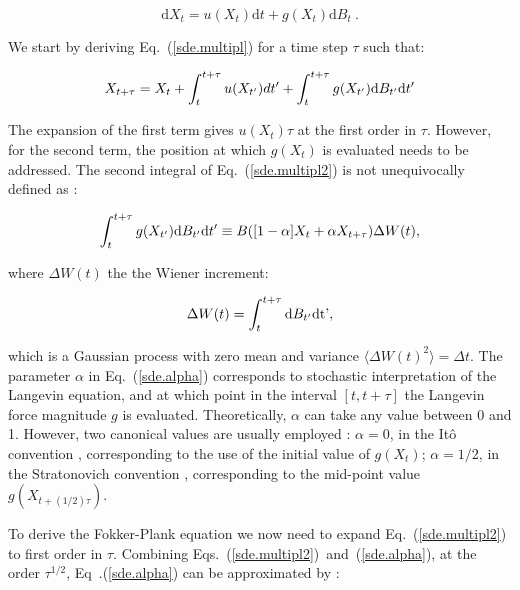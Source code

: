 \begin{equation}
	\mathrm{d}X_t = u(X_t)\mathrm{d}t + g(X_t)\mathrm{d}B_t~.
	\label{sde.multipl}
\end{equation}

We start by deriving Eq.~(\ref{sde.multipl}) for a time step $\tau$ such that:

\begin{equation}
	X_{t+\tau} = X_t + \int_{t}^{t+\tau} u(X_{t'})dt' + \int_{t}^{t+\tau} g(X_{t'})\textnormal{d}B_{t'}\textnormal{d}t'
	\label{sde.multipl2}
\end{equation}

The expansion of the first term gives $u(X_t)\tau$ at the first order in $\tau$. However, for the second term, the position at which $g(X_t)$ is evaluated needs to be addressed. The second integral of Eq.~{(\ref{sde.multipl2})} is not unequivocally defined as \cite{sancho_brownian_2011}:

\begin{equation}
	\int_{t}^{t+\tau}g(X_{t'})\textnormal{d}B_{t'}\textnormal{d}t' \equiv B([1 - \alpha] X_t + \alpha X_{t+\tau}) \Delta W(t),
	\label{sde.alpha}
\end{equation}

where $\Delta W (t)$ the the Wiener increment:

\begin{equation}
	\Delta W(t) = \int_{t}^{t+\tau} \textnormal{d} B_{t'} \textnormal{dt'},
\end{equation}

which is a Gaussian process with zero mean and variance $\langle \Delta W(t)^2 \rangle = \Delta t $. The parameter $\alpha$ in Eq.~{(\ref{sde.alpha})} corresponds to stochastic interpretation of the Langevin equation, and at which point in the interval $[t, t+\tau]$ the Langevin force magnitude $g$ is evaluated. Theoretically, $\alpha$ can take any value between 0 and 1. However, two canonical values are usually employed :  $\alpha = 0$, in the Itô convention \cite{ito_stochastic_1944}, corresponding to the use of the initial value of $g(X_t)$; $\alpha = 1/2$, in the Stratonovich convention \cite{stratonovich_new_1966}, corresponding to the mid-point value $g(X_{t + (1/2)\tau})$. 

To derive the Fokker-Plank equation we now need to expand Eq.~(\ref{sde.multipl2}) to first order in $\tau $. Combining Eqs.~(\ref{sde.multipl2})~and~(\ref{sde.alpha}), at the order $\tau^{1/2}$, Eq~.(\ref{sde.alpha}) can be approximated by \cite{sancho_brownian_2011}:

